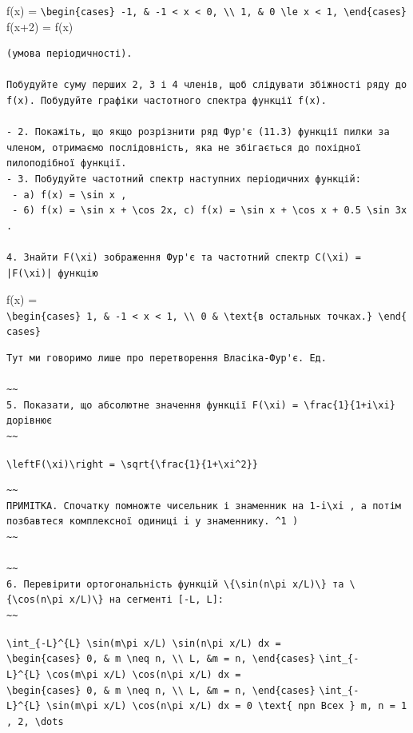 \documentclass[
  ukrainian,
]{article}
\begin{document}
f(x) =
\texttt{\textbackslash{}begin\{cases\}\ -1,\ \&\ -1\ \textless{}\ x\ \textless{}\ 0,\ \textbackslash{}\textbackslash{}\ 1,\ \&\ 0\ \textbackslash{}le\ x\ \textless{}\ 1,\ \textbackslash{}end\{cases\}}
f(x+2) = f(x)

\begin{verbatim}
(умова періодичності).

Побудуйте суму перших 2, 3 і 4 членів, щоб слідувати збіжності ряду до f(x). Побудуйте графіки частотного спектра функції f(x).

- 2. Покажіть, що якщо розрізнити ряд Фур'є (11.3) функції пилки за членом, отримаємо послідовність, яка не збігається до похідної пилоподібної функції.
- 3. Побудуйте частотний спектр наступних періодичних функцій:
 - a) f(x) = \sin x ,
 - 6) f(x) = \sin x + \cos 2x, c) f(x) = \sin x + \cos x + 0.5 \sin 3x .

4. Знайти F(\xi) зображення Фур'є та частотний спектр C(\xi) = |F(\xi)| функцію
\end{verbatim}

f(x) =
\texttt{\textbackslash{}begin\{cases\}\ 1,\ \&\ -1\ \textless{}\ x\ \textless{}\ 1,\ \textbackslash{}\textbackslash{}\ 0\ \&\ \textbackslash{}text\{в\ остальных\ точках.\}\ \textbackslash{}end\{cases\}}

\begin{verbatim}
Тут ми говоримо лише про перетворення Власіка-Фур'є. Ед.

~~
5. Показати, що абсолютне значення функції F(\xi) = \frac{1}{1+i\xi} дорівнює
~~
\end{verbatim}

\texttt{\textbackslash{}left\textbar{}F(\textbackslash{}xi)\textbackslash{}right\textbar{}\ =\ \textbackslash{}sqrt\{\textbackslash{}frac\{1\}\{1+\textbackslash{}xi\^{}2\}\}}

\begin{verbatim}
~~
ПРИМІТКА. Спочатку помножте чисельник і знаменник на 1-i\xi , а потім позбавтеся комплексної одиниці i у знаменнику. ^1 )
~~

~~
6. Перевірити ортогональність функцій \{\sin(n\pi x/L)\} та \{\cos(n\pi x/L)\} на сегменті [-L, L]:
~~
\end{verbatim}

\texttt{\textbackslash{}int\_\{-L\}\^{}\{L\}\ \textbackslash{}sin(m\textbackslash{}pi\ x/L)\ \textbackslash{}sin(n\textbackslash{}pi\ x/L)\ dx\ =}
\texttt{\textbackslash{}begin\{cases\}\ 0,\ \&\ m\ \textbackslash{}neq\ n,\ \textbackslash{}\textbackslash{}\ L,\ \&m\ =\ n,\ \textbackslash{}end\{cases\}}
\texttt{\textbackslash{}int\_\{-L\}\^{}\{L\}\ \textbackslash{}cos(m\textbackslash{}pi\ x/L)\ \textbackslash{}cos(n\textbackslash{}pi\ x/L)\ dx\ =}
\texttt{\textbackslash{}begin\{cases\}\ 0,\ \&\ m\ \textbackslash{}neq\ n,\ \textbackslash{}\textbackslash{}\ L,\ \&m\ =\ n,\ \textbackslash{}end\{cases\}}
\texttt{\textbackslash{}int\_\{-L\}\^{}\{L\}\ \textbackslash{}sin(m\textbackslash{}pi\ x/L)\ \textbackslash{}cos(n\textbackslash{}pi\ x/L)\ dx\ =\ 0\ \textbackslash{}text\{\ npn\ Bcex\ \}\ m,\ n\ =\ 1,\ 2,\ \textbackslash{}dots}
\end{document}
